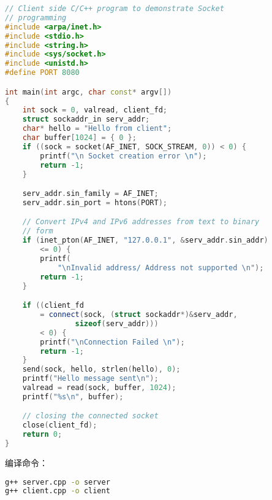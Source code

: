 \begin{lstlisting}[language=cpp, caption=client.cpp]
// Client side C/C++ program to demonstrate Socket
// programming
#include <arpa/inet.h>
#include <stdio.h>
#include <string.h>
#include <sys/socket.h>
#include <unistd.h>
#define PORT 8080

int main(int argc, char const* argv[])
{
	int sock = 0, valread, client_fd;
	struct sockaddr_in serv_addr;
	char* hello = "Hello from client";
	char buffer[1024] = { 0 };
	if ((sock = socket(AF_INET, SOCK_STREAM, 0)) < 0) {
		printf("\n Socket creation error \n");
		return -1;
	}

	serv_addr.sin_family = AF_INET;
	serv_addr.sin_port = htons(PORT);

	// Convert IPv4 and IPv6 addresses from text to binary
	// form
	if (inet_pton(AF_INET, "127.0.0.1", &serv_addr.sin_addr)
		<= 0) {
		printf(
			"\nInvalid address/ Address not supported \n");
		return -1;
	}

	if ((client_fd
		= connect(sock, (struct sockaddr*)&serv_addr,
				sizeof(serv_addr)))
		< 0) {
		printf("\nConnection Failed \n");
		return -1;
	}
	send(sock, hello, strlen(hello), 0);
	printf("Hello message sent\n");
	valread = read(sock, buffer, 1024);
	printf("%s\n", buffer);

	// closing the connected socket
	close(client_fd);
	return 0;
}
\end{lstlisting}
编译命令：
\begin{lstlisting}[language=bash]
g++ server.cpp -o server
g++ client.cpp -o client
\end{lstlisting}
